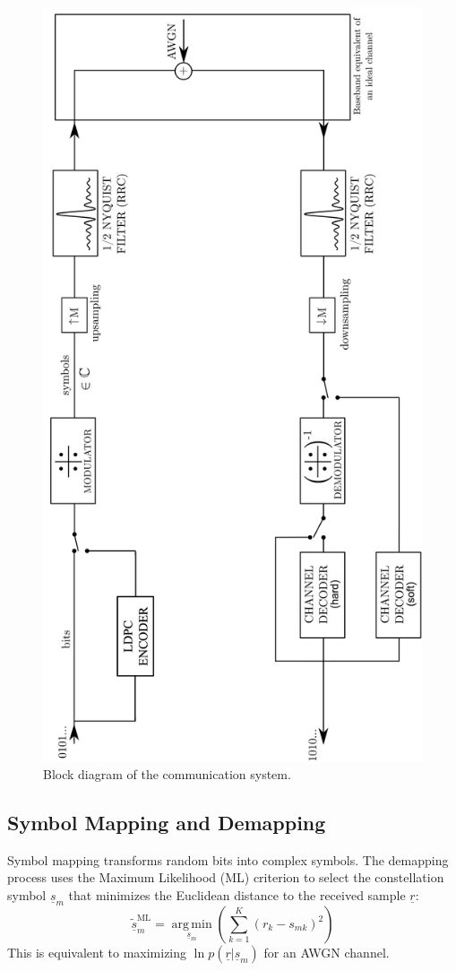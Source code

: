 \documentclass[11pt]{article}
\begin{document}
	\begin{figure}[H]
		\centering
		\includegraphics[angle=-90, width=0.6\linewidth]{Images/com-chain}
		\caption{Block diagram of the communication system.}
		\label{fig:com-chain}
	\end{figure}
	
	\subsection{Symbol Mapping and Demapping}
	Symbol mapping transforms random bits into complex symbols. The demapping process uses the Maximum Likelihood (ML) criterion to select the constellation symbol $\underline{s}_{m}$ that minimizes the Euclidean distance to the received sample $\underline{r}$:
	\begin{equation}
		\tilde{\underline{s}}_{m}^{\text{ML}} = \operatorname*{arg\,min}_{\underline{s}_{m}} \left(\sum_{k=1}^{K}(r_{k}-s_{mk})^{2}\right)
	\end{equation}
	This is equivalent to maximizing $\ln p(\underline{r}|\underline{s}_{m})$ for an AWGN channel.
	
\end{document}
